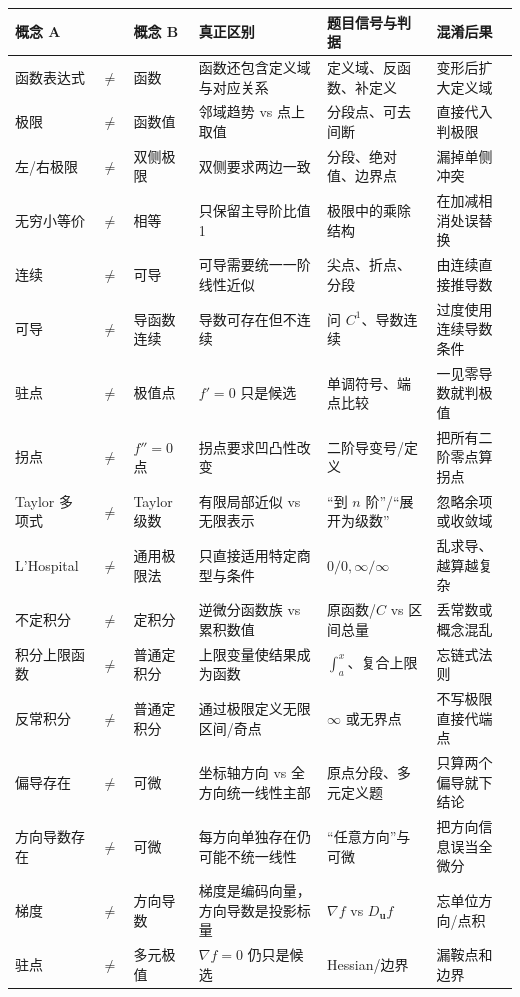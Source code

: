\documentclass[11pt,a4paper,openany]{ctexbook}
\begin{document}
\begin{longtable}{L{2.2cm}@{}>{\centering\arraybackslash}p{0.5cm}@{}L{2.2cm}L{4.2cm}L{4.2cm}L{\dimexpr\linewidth-13.9cm\relax}}
\toprule
\textbf{概念 A} & & \textbf{概念 B} & \textbf{真正区别} & \textbf{题目信号与判据} & \textbf{混淆后果}\\
\midrule
函数表达式 & $\neq$ & 函数 & 函数还包含定义域与对应关系 & 定义域、反函数、补定义 & 变形后扩大定义域\\
极限 & $\neq$ & 函数值 & 邻域趋势 vs 点上取值 & 分段点、可去间断 & 直接代入判极限\\
左/右极限 & $\neq$ & 双侧极限 & 双侧要求两边一致 & 分段、绝对值、边界点 & 漏掉单侧冲突\\
无穷小等价 & $\neq$ & 相等 & 只保留主导阶比值 1 & 极限中的乘除结构 & 在加减相消处误替换\\
连续 & $\neq$ & 可导 & 可导需要统一一阶线性近似 & 尖点、折点、分段 & 由连续直接推导数\\
可导 & $\neq$ & 导函数连续 & 导数可存在但不连续 & 问 $C^1$、导数连续 & 过度使用连续导数条件\\
驻点 & $\neq$ & 极值点 & $f'=0$ 只是候选 & 单调符号、端点比较 & 一见零导数就判极值\\
拐点 & $\neq$ & $f''=0$ 点 & 拐点要求凹凸性改变 & 二阶导变号/定义 & 把所有二阶零点算拐点\\
Taylor 多项式 & $\neq$ & Taylor 级数 & 有限局部近似 vs 无限表示 & “到 $n$ 阶”/“展开为级数” & 忽略余项或收敛域\\
L'Hospital & $\neq$ & 通用极限法 & 只直接适用特定商型与条件 & $0/0,\infty/\infty$ & 乱求导、越算越复杂\\
不定积分 & $\neq$ & 定积分 & 逆微分函数族 vs 累积数值 & 原函数/$C$ vs 区间总量 & 丢常数或概念混乱\\
积分上限函数 & $\neq$ & 普通定积分 & 上限变量使结果成为函数 & $\int_a^x$、复合上限 & 忘链式法则\\
反常积分 & $\neq$ & 普通定积分 & 通过极限定义无限区间/奇点 & $\infty$ 或无界点 & 不写极限直接代端点\\
偏导存在 & $\neq$ & 可微 & 坐标轴方向 vs 全方向统一线性主部 & 原点分段、多元定义题 & 只算两个偏导就下结论\\
方向导数存在 & $\neq$ & 可微 & 每方向单独存在仍可能不统一线性 & “任意方向”与可微 & 把方向信息误当全微分\\
梯度 & $\neq$ & 方向导数 & 梯度是编码向量，方向导数是投影标量 & $\nabla f$ vs $D_{\bm u}f$ & 忘单位方向/点积\\
驻点 & $\neq$ & 多元极值 & $\nabla f=0$ 仍只是候选 & Hessian/边界 & 漏鞍点和边界\\

\end{longtable}
\end{document}

